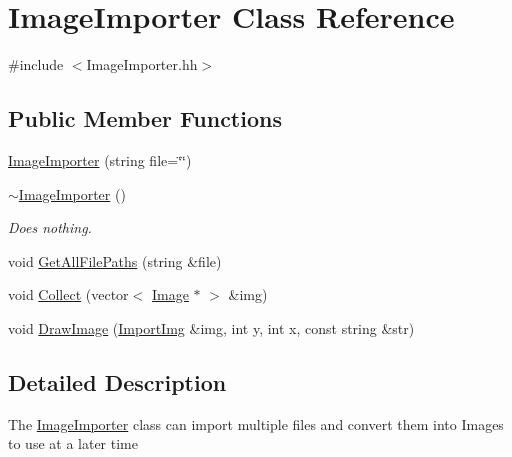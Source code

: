 \hypertarget{classImageImporter}{\section{Image\-Importer Class Reference}
\label{classImageImporter}
}


{\ttfamily \#include $<$Image\-Importer.\-hh$>$}

\subsection*{Public Member Functions}
\begin{DoxyCompactItemize}
\item 
\hyperlink{classImageImporter_a66e456e2a48df9e1ccd729d41f81f1b8}{Image\-Importer} (string file=\char`\"{}\char`\"{})
\item 
\hypertarget{classImageImporter_aeb07a2a5d1af993e336ff5bd84217b0c}{\hyperlink{classImageImporter_aeb07a2a5d1af993e336ff5bd84217b0c}{$\sim$\-Image\-Importer} ()}\label{classImageImporter_aeb07a2a5d1af993e336ff5bd84217b0c}

\begin{DoxyCompactList}\small\item\em Does nothing. \end{DoxyCompactList}\item 
void \hyperlink{classImageImporter_a923f081a44c874c972f0da3870f7e1a1}{Get\-All\-File\-Paths} (string \&file)
\item 
void \hyperlink{classImageImporter_a423205b60aaba4ef740a2ac5aad77bc7}{Collect} (vector$<$ \hyperlink{classImage}{Image} $\ast$ $>$ \&img)
\item 
void \hyperlink{classImageImporter_aace3de3bdb1a1757fb6b751b3b12d5bd}{Draw\-Image} (\hyperlink{classImportImg}{Import\-Img} \&img, int y, int x, const string \&str)
\end{DoxyCompactItemize}


\subsection{Detailed Description}
The \hyperlink{classImageImporter}{Image\-Importer} class can import multiple files and convert them into Images to use at a later time 

